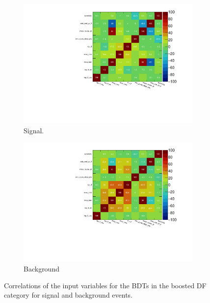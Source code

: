 \begin{figure}[htb]
    \centering
    \begin{subfigure}[t]{0.7\textwidth}
        \includegraphics[width=\textwidth]{./plots/mva/variable_reduction/BOOST_DF_CorrelationMatrixS.pdf}
        \caption{Signal.}
    \end{subfigure}
    \begin{subfigure}[t]{0.7\textwidth}
        \includegraphics[width=\textwidth]{./plots/mva/variable_reduction/BOOST_DF_CorrelationMatrixB.pdf}
        \caption{Background}
    \end{subfigure}
    \caption{Correlations of the input variables for the BDTs in the boosted DF category for signal and background events.}\label{fig:mva:variables:correlationsb:boostdf}
\end{figure}
